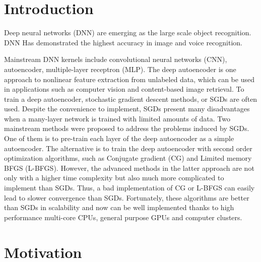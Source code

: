 \documentclass{article}
\begin{document}
\section{Introduction}
Deep neural networks (DNN) are emerging as the large scale object recognition. DNN Has demonstrated the highest accuracy in image and voice recognition.

Mainstream DNN kernels include convolutional neural networks (CNN), autoencoder, multiple-layer receptron (MLP).
The deep autoencoder is one approach to nonlinear feature extraction from unlabeled data, which can be used in applications such as computer vision and content-based image retrieval.
To train a deep autoencoder, stochastic gradient descent methods, or SGDs are often used. Despite the convenience to implement, SGDs present many disadvantages when a many-layer network is trained with limited amounts of data.
Two mainstream methods were proposed to address the problems induced by SGDs. One of them is to pre-train each layer of the deep autoencoder as a simple autoencoder\cite{Hinton2006}. The alternative is to train the deep autoencoder with second order optimization algorithms, such as Conjugate gradient (CG) and Limited memory BFGS (L-BFGS)\cite{QuocLe2011}.
However, the advanced methods in the latter approach are not only with a higher time complexity but also much more complicated to implement than SGDs. Thus, a bad implementation of CG or L-BFGS can easily lead to slower convergence than SGDs.
Fortunately, these algorithms are better than SGDs in scalability and now can be well implemented thanks to high performance multi-core CPUs, general purpose GPUs and computer clusters.



\section{Motivation}

\end{document}

